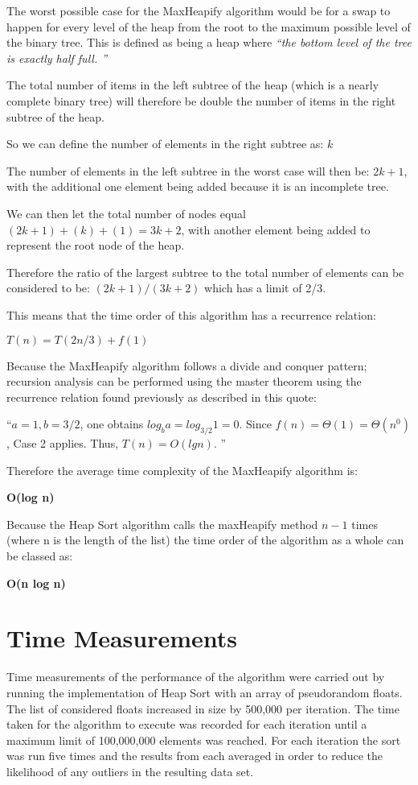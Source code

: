 \documentclass{article}
\begin{document}
The worst possible case for the MaxHeapify algorithm would be for a swap to happen for every level of the heap from the root to the maximum possible level of the binary tree. This is defined as being a heap where \textit{``the bottom level of the tree is exactly half full. \cite{clrsthirdedition}''}

The total number of items in the left subtree of the heap (which is a nearly complete binary tree) will therefore be double the number of items in the right subtree of the heap.

So we can define the number of elements in the right subtree as: $k$

The number of elements in the left subtree in the worst case will then be: $2k + 1$, with the additional one element being added because it is an incomplete tree.

We can then let the total number of nodes equal $(2k + 1) + (k) + (1) = 3k + 2$, with another element being added to represent the root node of the heap.

Therefore the ratio of the largest subtree to the total number of elements can be considered to be: $(2k + 1)/(3k + 2)$ which has a limit of 2/3.

This means that the time order of this algorithm has a recurrence relation:
\begin{center}
$T(n) = T(2n/3) + f(1)$
\end{center}
Because the MaxHeapify algorithm follows a divide and conquer pattern; recursion analysis can be performed using the master theorem using the recurrence relation found previously as described in this quote:

``$a = 1, b = 3/2$, one obtains $log_b a = log_{3/2} 1 = 0$. Since $f(n) = Θ(1) = Θ(n^0)$, Case 2 applies. Thus, $T(n) = O(lg n)$. \cite{heapsort}''

Therefore the average time complexity of the MaxHeapify algorithm is:
\begin{center}
\textbf{O(log n)}
\end{center}

Because the Heap Sort algorithm calls the maxHeapify method $n - 1$ times (where n is the length of the list) the time order of the algorithm as a whole can be classed as:
\begin{center}
\textbf{O(n log n)}
\end{center}



\section{Time Measurements}
Time measurements of the performance of the algorithm were carried out by running the implementation of Heap Sort with an array of pseudorandom floats. The list of considered floats increased in size by 500,000 per iteration. The time taken for the algorithm to execute was recorded for each iteration until a maximum limit of 100,000,000 elements was reached. For each iteration the sort was run five times and the results from each averaged in order to reduce the likelihood of any outliers in the resulting data set.
\end{document}
